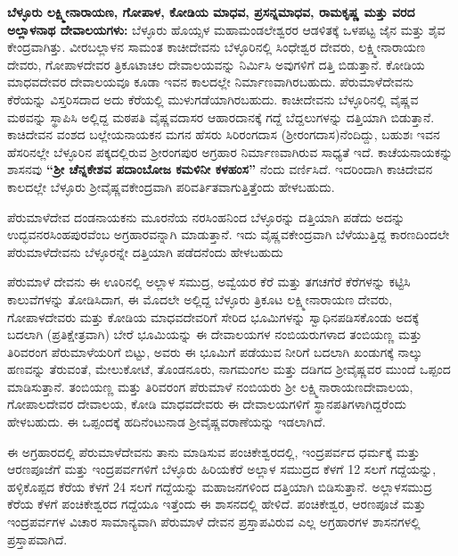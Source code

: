 \textbf{ಬೆಳ್ಳೂರು ಲಕ್ಷ್ಮೀನಾರಾಯಣ, ಗೋಪಾಳ, ಕೋಡಿಯ ಮಾಧವ, ಪ್ರಸನ್ನಮಾಧವ, ರಾಮಕೃಷ್ಣ ಮತ್ತು ವರದ ಅಲ್ಲಾಳನಾಥ ದೇವಾಲಯಗಳು:} ಬೆಳ್ಳೂರು ಹೊಯ್ಸಳ ಮಹಾಮಂಡಲೇಶ್ವರರ ಆಡಳಿತಕ್ಕೆ ಒಳಪಟ್ಟ ಜೈನ ಮತ್ತು ಶೈವ ಕೇಂದ್ರವಾಗಿತ್ತು. ವೀರಬಲ್ಲಾಳನ ಸಾಮಂತ ಕಾಚೀದೇವನು ಬೆಳ್ಳೂರಿನಲ್ಲಿ ಸಿಂಧೇಶ್ವರ ದೇವರು, ಲಕ್ಷ್ಮೀನಾರಾಯಣ ದೇವರು, ಗೋಪಾಳದೇವರ ತ್ರಿಕೂಟಾಚಲ ದೇವಾಲಯವನ್ನು ನಿರ್ಮಿಸಿ ಅವುಗಳಿಗೆ ದತ್ತಿ ಬಿಡುತ್ತಾನೆ. ಕೋಡಿಯ ಮಾಧವದೇವರ ದೇವಾಲಯವೂ ಕೂಡಾ ಇವನ ಕಾಲದಲ್ಲೇ ನಿರ್ಮಾಣವಾಗಿರಬಹುದು. ಪೆರುಮಾಳೆದೇವನು ಕೆರೆಯನ್ನು ವಿಸ್ತರಿಸದಾದ ಅದು ಕೆರೆಯಲ್ಲಿ ಮುಳುಗಡೆಯಾಗಿರಬಹುದು. ಕಾಚೀದೇವನು ಬೆಳ್ಳೂರಿನಲ್ಲಿ ವೈಷ್ಣವ ಮಠವನ್ನು ಸ್ಥಾಪಿಸಿ ಅಲ್ಲಿದ್ದ ಮಠಪತಿ ವೈಷ್ಣವದಾಸರ ಆಹಾರದಾನಕ್ಕೆ ಗದ್ದೆ ಬೆದ್ದಲುಗಳನ್ನು ದತ್ತಿಯಾಗಿ ಬಿಡುತ್ತಾನೆ. ಕಾಚಿದೇವನ ವಂಶದ ಬಲ್ಲೇಯನಾಯಕನ ಮಗನ ಹೆಸರು ಸಿರಿರಂಗದಾಸ (ಶ‍್ರೀರಂಗದಾಸ)ನೆಂದಿದ್ದು, ಬಹುಶಃ ಇವನ ಹೆಸರಿನಲ್ಲೇ ಬೆಳ್ಳೂರಿನ ಪಕ್ಕದಲ್ಲಿರುವ ಶ‍್ರೀರಂಗಪುರ ಅಗ್ರಹಾರ ನಿರ್ಮಾಣವಾಗಿರುವ ಸಾಧ್ಯತೆ ಇದೆ. ಕಾಚೆಯನಾಯಕನ್ನು ಶಾಸನವು \textbf{“ಶ‍್ರೀ ಚೆನ್ನಕೇಶವ ಪದಾಂಬೋಜ ಕಮಳಿನೀ ಕಳಹಂಸ” }ನೆಂದು ವರ್ಣಿಸಿದೆ. ಇದರಿಂದಾಗಿ ಕಾಚಿದೇವನ ಕಾಲದಲ್ಲೇ ಬೆಳ್ಳೂರು ಶ‍್ರೀವೈಷ್ಣವಕೇಂದ್ರವಾಗಿ ಪರಿವರ್ತಿತವಾಗುತ್ತಿತ್ತೆಂದು ಹೇಳಬಹುದು. 

ಪೆರುಮಾಳೆದೇವ ದಂಡನಾಯಕನು ಮೂರನೆಯ ನರಸಿಂಹನಿಂದ ಬೆಳ್ಳೂರನ್ನು ದತ್ತಿಯಾಗಿ ಪಡೆದು ಅದನ್ನು ಉದ್ಭವನರಸಿಂಹಪುರವೆಂಬ ಅಗ್ರಹಾರವನ್ನಾಗಿ ಮಾಡುತ್ತಾನೆ. ಇದು ವೈಷ್ಣವಕೇಂದ್ರವಾಗಿ ಬೆಳೆಯುತ್ತಿದ್ದ ಕಾರಣದಿಂದಲೇ ಪೆರುಮಾಳೆದೇವನು ಬೆಳ್ಳೂರನ್ನೇ ದತ್ತಿಯಾಗಿ ಪಡೆದನೆಂದು ಹೇಳಬಹುದು

ಪೆರುಮಾಳೆ ದೇವನು ಈ ಊರಿನಲ್ಲಿ ಅಲ್ಲಾಳ ಸಮುದ್ರ, ಅವ್ವೆಯರ ಕೆರೆ ಮತ್ತು ತಗಚಗೆರೆ ಕೆರೆಗಳನ್ನು ಕಟ್ಟಿಸಿ ಕಾಲುವೆಗಳನ್ನು ತೋಡಿಸಿದಾಗ, ಈ ಮೊದಲೇ ಅಲ್ಲಿದ್ದ ಬೆಳ್ಳೂರು ತ್ರಿಕೂಟ ಲಕ್ಷ್ಮೀನಾರಾಯಣ ದೇವರು, ಗೋಪಾಳದೇವರು ಮತ್ತು ಕೋಡಿಯ ಮಾಧವದೇವರಿಗೆ ಸೇರಿದ ಭೂಮಿಗಳನ್ನು ಸ್ವಾಧಿನಪಡಿಸಕೊಂಡು ಅದಕ್ಕೆ ಬದಲಾಗಿ (ಪ್ರತಿಕ್ಷೇತ್ರವಾಗಿ) ಬೇರೆ ಭೂಮಿಯನ್ನು ಈ ದೇವಾಲಯಗಳ ನಂಬಿಯರುಗಳಾದ ತಂಬಿಯಣ್ಣ ಮತ್ತು ತಿರಿವರಂಗ ಪೆರುಮಾಳೆಯರಿಗೆ ಬಿಟ್ಟು, ಅವರು ಈ ಭೂಮಿಗೆ ಪಡೆಯುವ ನೀರಿಗೆ ಬದಲಾಗಿ ಖಂಡುಗಕ್ಕೆ ನಾಲ್ಕು ಹಣವನ್ನು ತೆರುವಂತೆ, ಮೇಲುಕೋಟೆ, ತೊಂಡನೂರು, ನಾಗಮಂಗಲ ಮತ್ತು ದಡಿಗದ ಶ‍್ರೀವೈಷ್ಣವರ ಮುಂದೆ ಒಪ್ಪಂದ ಮಾಡಿಸುತ್ತಾನೆ. ತಂಬಿಯಣ್ಣ ಮತ್ತು ತಿರಿವರಂಗ ಪೆರುಮಾಳೆ ನಂಬಿಯರು ಶ‍್ರೀ ಲಕ್ಷ್ಮಿನಾರಾಯಣದೇವಾಲಯ, ಗೋಪಾಲದೇವರ ದೇವಾಲಯ, ಕೋಡಿ ಮಾಧವದೇವರು ಈ ದೇವಾಲಯಗಳಿಗೆ ಸ್ಥಾನಪತಿಗಳಾಗಿದ್ದರೆಂದು ಹೇಳಬಹುದು. ಈ ಒಪ್ಪಂದಕ್ಕೆ ಹದಿನೆಂಟುನಾಡ ಶ‍್ರೀವೈಷ್ಣವರಾಣೆಯನ್ನು ಇಡಲಾಗಿದೆ.

ಈ ಅಗ್ರಹಾರದಲ್ಲಿ ಪೆರುಮಾಳೆದೇವನು ತಾನು ಮಾಡಿಸುವ ಪಂಚಿಕೇಶ್ವರದಲ್ಲಿ, ಇಂದ್ರಪರ್ವದ ಧರ್ಮಕ್ಕೆ ಮತ್ತು ಆರಣಪೂಜೆಗೆ ಮತ್ತು ಇಂದ್ರಪರ್ವಗಳಿಗೆ ಬೆಳ್ಳೂರು ಹಿರಿಯಕೆರೆ ಅಲ್ಲಾಳ ಸಮುದ್ರದ ಕೆಳಗೆ 12 ಸಲಗೆ ಗದ್ದೆಯನ್ನು, ಹಳ್ಳಿಕೊಪ್ಪದ ಕೆರೆಯ ಕೆಳಗೆ 24 ಸಲಗೆ ಗದ್ದೆಯನ್ನು ಮಹಾಜನಗಳಿಂದ ದತ್ತಿಯಾಗಿ ಬಿಡಿಸುತ್ತಾನೆ. ಅಲ್ಲಾಳಸಮುದ್ರ ಕೆರೆಯ ಕೆಳಗೆ ಪಂಚಿಕೇಶ್ವರದ ಗದ್ದೆಯೂ ಇತ್ತೆಂದು ಈ ಶಾಸನದಲ್ಲಿ ಹೇಳಿದೆ. ಪಂಚಿಕೇಶ್ವರ, ಆರಣಪೂಜೆ ಮತ್ತು ಇಂದ್ರಪರ್ವಗಳ ವಿಚಾರ ಸಾಮಾನ್ಯವಾಗಿ ಪೆರುಮಾಳೆ ದೇವನ ಪ್ರಸ್ತಾಪವಿರುವ ಎಲ್ಲ ಅಗ್ರಹಾರಗಳ ಶಾಸನಗಳಲ್ಲಿ ಪ್ರಸ್ತಾಪವಾಗಿದೆ.


